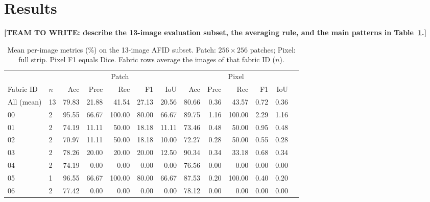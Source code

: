 \documentclass[conference]{IEEEtran}
\newcommand{\teamtowrite}[1]{\textbf{[TEAM TO WRITE: #1]}}
\begin{document}
\section{Results}
\teamtowrite{describe the 13-image evaluation subset, the averaging rule, and the main patterns in Table~\ref{tab:results}.}

\begin{table}[!t]
\caption{Mean per-image metrics (\%) on the 13-image AFID subset. Patch: $256\times256$ patches; Pixel: full strip. Pixel F1 equals Dice. Fabric rows average the images of that fabric ID ($n$).}
\label{tab:results}
\centering
\footnotesize
\setlength{\tabcolsep}{4pt}
\begin{tabular}{@{}llrrrrrrrrrrr@{}}
\toprule
 & & \multicolumn{5}{c}{Patch} & \multicolumn{5}{c}{Pixel} \\
\cmidrule(lr){3-7}\cmidrule(lr){8-12}
Fabric ID & $n$ & Acc & Prec & Rec & F1 & IoU & Acc & Prec & Rec & F1 & IoU \\
\midrule
All (mean) & 13 & 79.83 & 21.88 & 41.54 & 27.13 & 20.56 & 80.66 & 0.36 & 43.57 & 0.72 & 0.36 \\
\midrule
00 & 2 & 95.55 & 66.67 & 100.00 & 80.00 & 66.67 & 89.75 & 1.16 & 100.00 & 2.29 & 1.16 \\
01 & 2 & 74.19 & 11.11 & 50.00 & 18.18 & 11.11 & 73.46 & 0.48 & 50.00 & 0.95 & 0.48 \\
02 & 2 & 70.97 & 11.11 & 50.00 & 18.18 & 10.00 & 72.27 & 0.28 & 50.00 & 0.55 & 0.28 \\
03 & 2 & 78.26 & 20.00 & 20.00 & 20.00 & 12.50 & 90.34 & 0.34 & 33.18 & 0.68 & 0.34 \\
04 & 2 & 74.19 & 0.00 & 0.00 & 0.00 & 0.00 & 76.56 & 0.00 & 0.00 & 0.00 & 0.00 \\
05 & 1 & 96.55 & 66.67 & 100.00 & 80.00 & 66.67 & 87.53 & 0.20 & 100.00 & 0.40 & 0.20 \\
06 & 2 & 77.42 & 0.00 & 0.00 & 0.00 & 0.00 & 78.12 & 0.00 & 0.00 & 0.00 & 0.00 \\
\bottomrule
\end{tabular}
\end{table}
\end{document}
